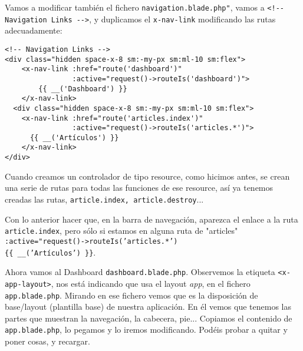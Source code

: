 \documentclass[11pt]{article}
\begin{document}
Vamos a modificar también el fichero \texttt{navigation.blade.php"}, vamos a
\texttt{<!-{}- Navigation Links -{}->}, y duplicamos el \texttt{x-nav-link} modificando
las rutas adecuadamente:

\begin{verbatim}
<!-- Navigation Links -->
<div class="hidden space-x-8 sm:-my-px sm:ml-10 sm:flex">
    <x-nav-link :href="route('dashboard')"
                :active="request()->routeIs('dashboard')">
        {{ __('Dashboard') }}
    </x-nav-link>
  <div class="hidden space-x-8 sm:-my-px sm:ml-10 sm:flex">
    <x-nav-link :href="route('articles.index')"
                :active="request()->routeIs('articles.*')">
      {{ __('Artículos') }}
    </x-nav-link>
</div>
\end{verbatim}

Cuando creamos un controlador de tipo resource, como hicimos antes, se
crean una serie de rutas para todas las funciones de ese resource, así
ya tenemos creadas las rutas, \texttt{article.index, article.destroy}...

Con lo anterior hacer que, en la barra de navegación, aparezca el
enlace a la ruta \texttt{article.index}, pero sólo si estamos en alguna ruta
de "articles" \texttt{:active="request()->routeIs('articles.*')} \\
\texttt{\{\{ \_\_('Artículos') \}\}}.

Ahora vamos al Dashboard \texttt{dashboard.blade.php}. Observemos la etiqueta
\texttt{<x-app-layout>}, nos está indicando que usa el layout \emph{app}, en el
fichero \texttt{app.blade.php}. Mirando en ese fichero vemos que es la
disposición de base/layout (plantilla base) de nuestra aplicación. En
él vemos que tenemos las partes que muestran la navegación, la
cabecera, pie... Copiamos el contenido de \texttt{app.blade.php}, lo pegamos
y lo iremos modificando. Podéis probar a quitar y poner cosas, y recargar.
\end{document}
